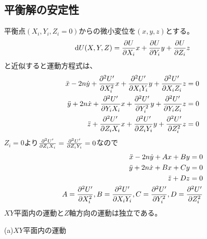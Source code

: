 	\subsection{平衡解の安定性}
		平衡点$(X_i,Y_i,Z_i = 0)$からの微小変位を$(x,y,z)$とする。
			\[\d U(X,Y,Z) = \pd[U]{X_i}x + \pd[U]{Y_i}y + \pd[U]{Z_i}z\]
		と近似すると運動方程式は、
		\begin{align*}
			\ddot{x} - 2n\dot{y} + \pd[^2U']{X_i^2}x + \pd[^2U']{X_iY_i}y + \pd[^2U']{X_iZ_i}z = 0\\
			\ddot{y} + 2n\dot{x} + \pd[^2U']{Y_iX_i}x + \pd[^2U']{Y_i^2}y + \pd[^2U']{Y_iZ_i}z = 0\\
			\ddot{z} + \pd[^2U']{Z_iX_i}x + \pd[^2U']{Z_iY_i}y + \pd[^2U']{Z_i^2}z = 0\\
		\end{align*}
		$Z_i = 0$より$\pd[^2U']{Z_iX_i} = \pd[^2U']{Z_iY_i} = 0$なので
		\begin{align}
			\ddot{x} - 2n\dot{y} + Ax + By = 0 \label{eq:xy-1}\\
			\ddot{y} + 2n\dot{x} + Bx + Cy = 0 \label{eq:xy-2}\\
			\ddot{z} + Dz = 0 \label{eq:z}\\
			A = \pd[^2U']{X_i^2}, B = \pd[^2U']{X_iY_i}, C = \pd[^2U']{Y_i^2}, D = \pd[^2U']{Z_i^2}\\
		\end{align}
		$XY$平面内の運動と$Z$軸方向の運動は独立である。

		(a)$XY$平面内の運動


